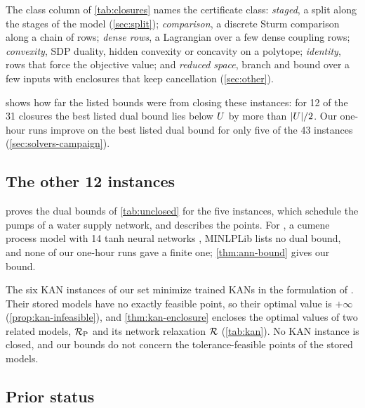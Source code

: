 The class column of \cref{tab:closures} names the certificate class: \emph{staged}, a split along the stages of the model (\cref{sec:split}); \emph{comparison}, a discrete Sturm comparison along a chain of rows; \emph{dense rows}, a Lagrangian over a few dense coupling rows; \emph{convexity}, SDP duality, hidden convexity or concavity on a polytope; \emph{identity}, rows that force the objective value; and \emph{reduced space}, branch and bound over a few inputs with enclosures that keep cancellation (\cref{sec:other}).

 shows how far the listed bounds were from closing these instances: for 12 of the 31 closures the best listed dual bound lies below $U$ by more than $|U|/2$.
Our one-hour runs improve on the best listed dual bound for only five of the 43 instances (\cref{sec:solvers-campaign}).

\subsection{The other 12 instances}\label{sec:results-other}

 proves the dual bounds of \cref{tab:unclosed} for the five  instances, which schedule the pumps of a water supply network, and describes the points.
For , a cumene process model with 14 tanh neural networks \citep{schweidtmann2019-deterministic-global-optimization-with-artificial}, MINLPLib lists no dual bound, and none of our one-hour runs gave a finite one; \cref{thm:ann-bound} gives our bound.

The six KAN instances of our set minimize trained KANs \citep{liu2024-kan-kolmogorov-arnold-networks} in the formulation of \citet{karia2025-deterministic-global-optimization-over-trained}.
Their stored models have no exactly feasible point, so their optimal value is $+\infty$ (\cref{prop:kan-infeasible}), and \cref{thm:kan-enclosure} encloses the optimal values of two related models, $\mathcal{R}_{\mathrm{P}}$ and its network relaxation $\mathcal{R}$ (\cref{tab:kan}).
No KAN instance is closed, and our bounds do not concern the tolerance-feasible points of the stored models.

\subsection{Prior status}\label{sec:results-prior}

